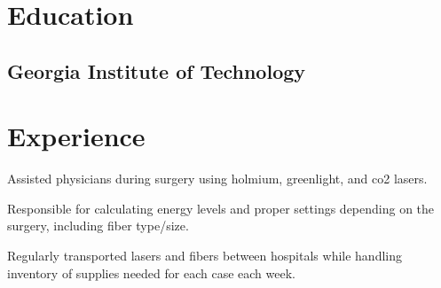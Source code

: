 \documentclass[]{deedy-resume-openfont}
\begin{document}
%
%
\lastupdated

%
%

%
%
\begin{minipage}[t]{0.66\textwidth} 



\section{Education} 
\subsection{Georgia Institute of Technology}
\sectionsep


\section{Experience}
\vspace{\topsep} %
\begin{tightemize}
\item Assisted physicians during surgery using holmium, greenlight, and co2 lasers.
\item Responsible for calculating energy levels and proper settings depending on the surgery, including fiber type/size.
\item Regularly transported lasers and fibers between hospitals while handling inventory of supplies needed for each case each week.
\end{tightemize}
\sectionsep


\end{minipage}
\end{document}

